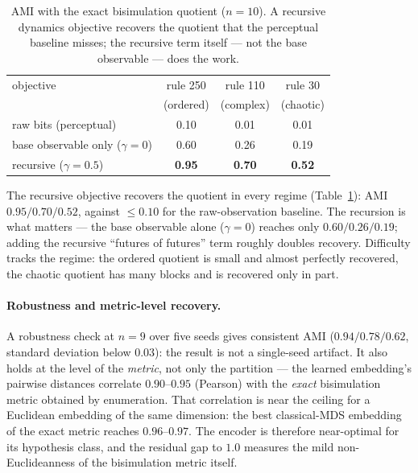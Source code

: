 \documentclass[11pt]{article}
\begin{document}
\begin{table}[h]
\centering
\caption{AMI with the exact bisimulation quotient ($n{=}10$). A recursive
dynamics objective recovers the quotient that the perceptual baseline misses;
the recursive term itself --- not the base observable --- does the work.}
\label{tab:positive}
\begin{tabular}{lccc}
\toprule
objective & rule 250 & rule 110 & rule 30 \\
          & (ordered) & (complex) & (chaotic) \\
\midrule
raw bits (perceptual)               & 0.10 & 0.01 & 0.01 \\
base observable only ($\gamma{=}0$) & 0.60 & 0.26 & 0.19 \\
recursive ($\gamma{=}0.5$)          & \textbf{0.95} & \textbf{0.70} & \textbf{0.52} \\
\bottomrule
\end{tabular}
\end{table}

The recursive objective recovers the quotient in every regime
(Table~\ref{tab:positive}): AMI $0.95/0.70/0.52$, against $\le 0.10$ for the
raw-observation baseline. The recursion is what matters --- the base observable
alone ($\gamma{=}0$) reaches only $0.60/0.26/0.19$; adding the recursive
``futures of futures'' term roughly doubles recovery. Difficulty tracks the
regime: the ordered quotient is small and almost perfectly recovered, the
chaotic quotient has many blocks and is recovered only in part.

\paragraph{Robustness and metric-level recovery.}
A robustness check at $n{=}9$ over five seeds gives consistent AMI
($0.94/0.78/0.62$, standard deviation below $0.03$): the result is not a
single-seed artifact. It also holds at the level of the \emph{metric}, not
only the partition --- the learned embedding's pairwise distances correlate
$0.90$--$0.95$ (Pearson) with the \emph{exact} bisimulation metric obtained by
enumeration. That correlation is near the ceiling for a Euclidean embedding of
the same dimension: the best classical-MDS embedding of the exact metric
reaches $0.96$--$0.97$. The encoder is therefore near-optimal for its
hypothesis class, and the residual gap to $1.0$ measures the mild
non-Euclideanness of the bisimulation metric itself.
\end{document}
